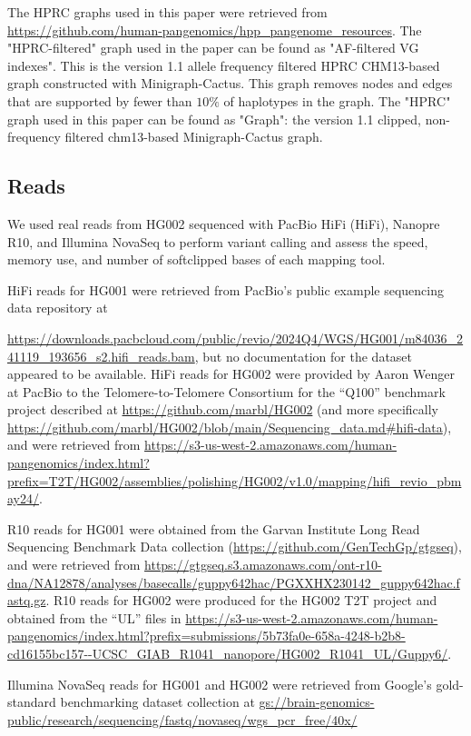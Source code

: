 \documentclass[11pt]{ucscthesis}
\begin{document}
The HPRC graphs used in this paper were retrieved from \url{https://github.com/human-pangenomics/hpp_pangenome_resources}.
The "HPRC-filtered" graph used in the paper can be found as "AF-filtered VG indexes".
This is the version 1.1 allele frequency filtered HPRC CHM13-based graph constructed with Minigraph-Cactus.
This graph removes nodes and edges that are supported by fewer than $10\%$ of haplotypes in the graph. 
The "HPRC" graph used in this paper can be found as "Graph": the version 1.1 clipped, non-frequency filtered chm13-based Minigraph-Cactus graph.

\subsection{Reads}
\label{subsec:sup-reads}
We used real reads from HG002 \citep{giab_data_2016} sequenced with PacBio HiFi (HiFi), Nanopre R10, and Illumina NovaSeq to perform variant calling and assess the speed, memory use, and number of softclipped bases of each mapping tool. 

HiFi reads for HG001 were retrieved from PacBio's public example sequencing data repository at \raggedright{\url{https://downloads.pacbcloud.com/public/revio/2024Q4/WGS/HG001/m84036_241119_193656_s2.hifi_reads.bam}}, but no documentation for the dataset appeared to be available.
HiFi reads for HG002 were provided by Aaron Wenger at PacBio to the Telomere-to-Telomere Consortium for the ``Q100'' benchmark project described at \url{https://github.com/marbl/HG002} (and more specifically \url{https://github.com/marbl/HG002/blob/main/Sequencing_data.md#hifi-data}), and were retrieved from \url{https://s3-us-west-2.amazonaws.com/human-pangenomics/index.html?prefix=T2T/HG002/assemblies/polishing/HG002/v1.0/mapping/hifi_revio_pbmay24/}. 

R10 reads for HG001 were obtained from the Garvan Institute Long Read Sequencing Benchmark Data collection (\url{https://github.com/GenTechGp/gtgseq}), and were retrieved from \url{https://gtgseq.s3.amazonaws.com/ont-r10-dna/NA12878/analyses/basecalls/guppy642hac/PGXXHX230142_guppy642hac.fastq.gz}.
R10 reads for HG002 were produced for the HG002 T2T project \citep{rautiainen_verkko_2023} and obtained from the ``UL'' files in \url{https://s3-us-west-2.amazonaws.com/human-pangenomics/index.html?prefix=submissions/5b73fa0e-658a-4248-b2b8-cd16155bc157--UCSC_GIAB_R1041_nanopore/HG002_R1041_UL/Guppy6/}.

Illumina NovaSeq reads for HG001 and HG002 were retrieved from Google's gold-standard benchmarking dataset collection \citep{baid_extensive_2020} at \url{gs://brain-genomics-public/research/sequencing/fastq/novaseq/wgs_pcr_free/40x/}
\end{document}
